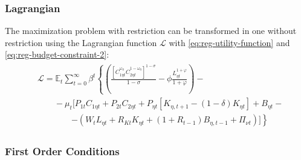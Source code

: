 \documentclass[
thesis.tex
]{subfiles}
\begin{document}
\subsubsection*{Lagrangian}

The maximization problem with restriction can be transformed in one without restriction using the Lagrangian function $\mathcal{L}$ with \ref{eq:reg-utility-function} and \ref{eq:reg-budget-constraint-2}:
\begin{align}
	\begin{split}
	& \mathcal{L} = \mathbb{E}_t \sum_{t=0}^{\infty} \beta^t \left\{ \left( \frac{ \left[ C_{1\eta t}^{\omega_{\eta}} C_{2\eta t}^{1-\omega_{\eta}} \right]^{1 -\sigma}}{1 -\sigma} - \phi \frac{L_{\eta t}^{1+\varphi}}{1+\varphi} \right) \right. - \\ & \qquad - \mu_t \Big[ P_{1t} C_{1\eta t} + P_{2t} C_{2\eta t} + P_{\eta t} [ K_{\eta, t+1} - (1-\delta)K_{\eta t} ] + B_{\eta t} - \\ & \qquad \qquad \left. - ( W_t L_{\eta t} + R_{Kt} K_{\eta t} + (1 + R_{t-1}) B_{\eta,t-1} + \Pi_{\nu t} ) \Big] \right\} \label{eq:reg-household-lagrangian}
	\end{split}
\end{align}

\subsubsection*{First Order Conditions}
\end{document}
